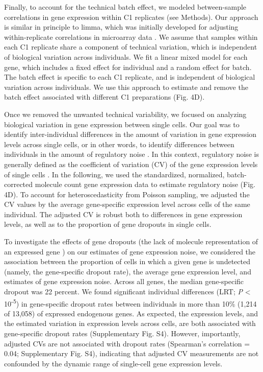 Finally, to account for the technical batch effect, we modeled
between-sample correlations in gene expression within C1 replicates (see
Methods). Our approach is similar in principle to limma, which was
initially developed for adjusting within-replicate correlations in
microarray data \citep{Smyth2005}. We assume that samples within each C1
replicate share a component of technical variation, which is independent
of biological variation across individuals. We fit a linear mixed model
for each gene, which includes a fixed effect for individual and a random
effect for batch. The batch effect is specific to each C1 replicate, and
is independent of biological variation across individuals. We use this
approach to estimate and remove the batch effect associated with
different C1 preparations (Fig. 4D).

Once we removed the unwanted technical variability, we focused on
analyzing biological variation in gene expression between single cells.
Our goal was to identify inter-individual differences in the amount of
variation in gene expression levels across single cells, or in other
words, to identify differences between individuals in the amount of
regulatory noise \citep{Raser2005}. In this context, regulatory noise is
generally defined as the coefficient of variation (CV) of the gene
expression levels of single cells \citep{Fehrmann2013}. In the following,
we used the standardized, normalized, batch-corrected molecule count
gene expression data to estimate regulatory noise (Fig. 4D). To account
for heteroscedasticity from Poisson sampling, we adjusted the CV values
by the average gene-specific expression level across cells of the same
individual. The adjusted CV is robust both to differences in gene
expression levels, as well as to the proportion of gene dropouts in
single cells.

To investigate the effects of gene dropouts (the lack of molecule
representation of an expressed gene \citep{Brennecke2013, Shalek2013})
on our estimates of gene expression noise, we considered the association
between the proportion of cells in which a given gene is undetected
(namely, the gene-specific dropout rate), the average gene expression
level, and estimates of gene expression noise. Across all genes, the
median gene-specific dropout was 22 percent. We found significant
individual differences (LRT; \emph{P} \textless{}
10\textsuperscript{-5}) in gene-specific dropout rates between
individuals in more than 10\% (1,214 of 13,058) of expressed endogenous
genes. As expected, the expression levels, and the estimated variation
in expression levels across cells, are both associated with
gene-specific dropout rates (Supplementary Fig. S4). However,
importantly, adjusted CVs are not associated with dropout rates
(Spearman's correlation = 0.04; Supplementary Fig. S4), indicating that
adjusted CV measurements are not confounded by the dynamic range of
single-cell gene expression levels.

